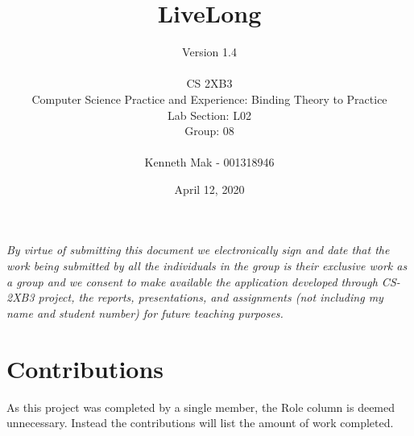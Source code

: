 \documentclass[12pt]{article}
\begin{document}
\title{\textbf{LiveLong}}
\author{Version 1.4\\ \\CS 2XB3 \\ Computer Science Practice and Experience: Binding Theory to Practice
\\ Lab Section: L02\\Group: 08\\ \\Kenneth Mak - 001318946}
\date{April 12, 2020}

\maketitle
\newpage
\begin{versionhistory}
\end{versionhistory} 
\bigskip
\textit{By virtue of submitting this document we electronically sign and date that the work being submitted by all the individuals in the group is their exclusive work as a group and we consent to make available the application developed through CS-2XB3 project, the reports, presentations, and assignments (not including my name and student number) for future teaching purposes.}

\newpage
\tableofcontents
\newpage
\section{Contributions}
As this project was completed by a single member, the Role column is deemed unnecessary. Instead the contributions will list the amount of work completed.
\end{document}
